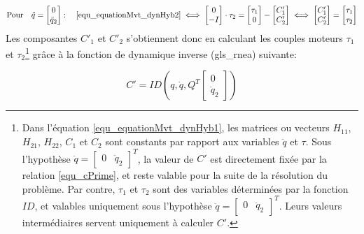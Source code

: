\documentclass{report}
\begin{document}
\begin{equation}
\textnormal{Pour} \quad \ddot{q}=
\begin{bmatrix}
  0 \\
  \ddot{q}_2
\end{bmatrix}
: \quad
\eqref{equ_equationMvt_dynHyb2} \iff
\begin{bmatrix}
  0 \\
  -I
\end{bmatrix} 
\cdot \tau_2
=
\begin{bmatrix}
  \tau_1 \\
  0
\end{bmatrix} 
-
\begin{bmatrix}
  C'_1 \\
  C'_2
\end{bmatrix}
\iff
\begin{bmatrix}
  C'_1 \\
  C'_2
\end{bmatrix}
=
\begin{bmatrix}
  \tau_1 \\
  \tau_2
\end{bmatrix} 
\end{equation}
\medskip
Les composantes $C'_1$ et $C'_2$ s'obtiennent donc en calculant les couples moteurs $\tau_1$ et $\tau_2$\footnote{%
Dans l'équation \eqref{equ_equationMvt_dynHyb1}, les matrices ou vecteurs $H_{11}$, $H_{21}$, $H_{22}$, $C_1$ et $C_2$ sont constants par rapport aux variables $\ddot{q}$ et $\tau$. Sous l'hypothèse \(\ddot{q}=\begin{bmatrix} 0 & \ddot{q}_2\end{bmatrix}^T\), la valeur de $C'$ est directement fixée par la relation \eqref{equ_cPrime}, et reste valable pour la suite de la résolution du problème. Par contre, $\tau_1$ et $\tau_2$ sont des variables déterminées par la fonction $ID$, et valables uniquement sous l'hypothèse \(\ddot{q}=\begin{bmatrix} 0 & \ddot{q}_2\end{bmatrix}^T\). Leurs valeurs intermédiaires servent uniquement à calculer $C'$.%
} grâce à la fonction de dynamique inverse (\gls{gls_rnea}) suivante:

\begin{equation}
C'=ID \left( q,\dot{q},Q^T
\begin{bmatrix}
  0 \\
  \ddot{q}_2
\end{bmatrix} \right)
\end{equation}
\end{document}
